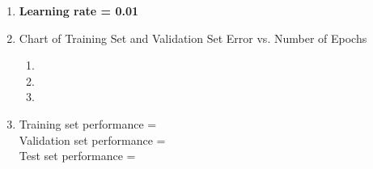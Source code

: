 \documentclass[12pt,letterpaper]{article}
\begin{document}
\begin{enumerate}
\begin{enumerate}
                \begin{enumerate}[label={\alph*) },ref={\alph*)}]
               \item \textbf{Learning rate = 0.01} \medskip
                \item Chart of Training Set and Validation Set Error vs. Number of Epochs\\
                        \begin{enumerate}[label={\roman*)},ref={\alph*)}]
                                \item
                                \item
                                \item
                        \end{enumerate} 
                        \bigskip
                \item Training set performance = \\
                      Validation set performance = \\
                      Test set performance = 
                      \bigskip
                \end{enumerate}  \medskip
                

\end{enumerate}
\end{enumerate}
\end{document}
